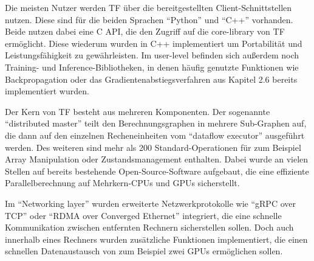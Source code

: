 Die meisten Nutzer werden \gls{TF} über die bereitgestellten Client-Schnittstellen nutzen. Diese sind für die beiden Sprachen "`Python"' und "`C++"' vorhanden. Beide nutzen dabei eine C API, die den Zugriff auf die core-library von \gls{TF} ermöglicht. Diese wiederum wurden in C++ implementiert um Portabilität und Leistungsfähigkeit zu gewährleisten. Im user-level befinden sich außerdem noch Training- und Inference-Bibliotheken, in denen häufig genutzte Funktionen wie Backpropagation oder das Gradientenabstiegsverfahren aus
Kapitel 2.6 bereits implementiert wurden.

Der Kern von \gls{TF} besteht aus mehreren Komponenten. Der sogenannte "`distributed master"' teilt den Berechnungsgraphen in mehrere Sub-Graphen auf, die dann auf den einzelnen Recheneinheiten vom "`dataflow executor"' ausgeführt werden. Des weiteren sind mehr als 200 Standard-Operationen für zum Beispiel Array Manipulation oder Zustandsmanagement enthalten. Dabei wurde an vielen Stellen auf bereits bestehende Open-Source-Software aufgebaut, die eine effiziente Parallelberechnung auf Mehrkern-CPUs und GPUs sicherstellt.

Im "`Networking layer"' wurden erweiterte Netzwerkprotokolle wie "`gRPC over TCP"' oder "`RDMA over Converged Ethernet"' integriert, die eine schnelle Kommunikation zwischen entfernten Rechnern sicherstellen sollen. Doch auch innerhalb eines Rechners wurden zusätzliche Funktionen implementiert, die einen schnellen Datenaustausch von zum Beispiel zwei GPUs ermöglichen sollen.
